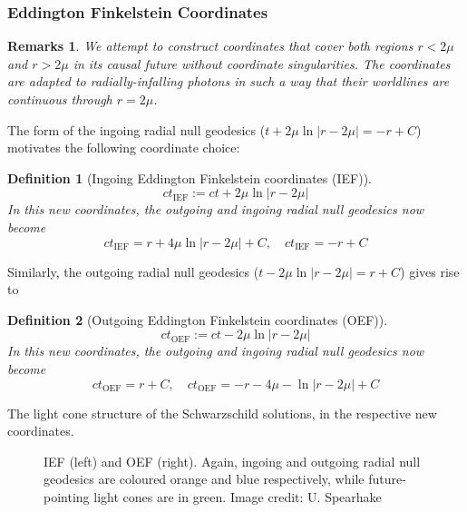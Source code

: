 \documentclass[a4paper]{article}
\newtheorem{remarks}{Remarks}[section]
\theoremstyle{new}
\newtheorem{defi}{Definition}[section]
\begin{document}
\subsubsection{Eddington Finkelstein Coordinates}
\begin{remarks}
We attempt to construct coordinates that cover both regions $r<2\mu$ and $r>2\mu$ in its causal future without coordinate singularities. The coordinates are adapted to radially-infalling photons in such a way that their worldlines are continuous through $r=2\mu$.
\end{remarks}
The form of the ingoing radial null geodesics ($t+2\mu\ln|r-2\mu|=-r+C$) motivates the following coordinate choice:
\begin{defi}[Ingoing Eddington Finkelstein coordinates (IEF)]
$$ct_{\text{IEF}}:=ct+2\mu\ln|r-2\mu|$$
In this new coordinates, the outgoing and ingoing radial null geodesics now become
$$ct_{\text{IEF}}=r+4\mu\ln|r-2\mu|+C,\quad ct_{\text{IEF}}=-r+C$$
\end{defi}
Similarly, the outgoing radial null geodesics ($t-2\mu\ln|r-2\mu|=r+C$) gives rise to 
\begin{defi}[Outgoing Eddington Finkelstein coordinates (OEF)]
$$ct_{\text{OEF}}:=ct-2\mu\ln|r-2\mu|$$
In this new coordinates, the outgoing and ingoing radial null geodesics now become
$$ct_{\text{OEF}}=r+C,\quad ct_{\text{OEF}}=-r-4\mu-\ln|r-2\mu|+C$$
\end{defi}
The light cone structure of the Schwarzschild solutions, in the respective new coordinates.
\begin{figure}[H]
\begin{minipage}{\linewidth}
\end{minipage}
    \caption{IEF (left) and OEF (right). Again, ingoing and outgoing radial null geodesics are coloured orange and blue respectively, while future-pointing light cones are in green. Image credit: U. Spearhake}
\end{figure}
\end{document}
